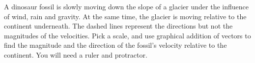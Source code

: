         A dinosaur fossil is slowly moving down the slope of a
        glacier under the influence of wind, rain and gravity. At
        the same time, the glacier is moving relative to the
        continent underneath. The dashed lines represent the
        directions but not the magnitudes of the velocities. Pick a
        scale, and use graphical addition of vectors to find the
        magnitude and the direction of the fossil's velocity
        relative to the continent. You will need a ruler and
        protractor. \answercheck
